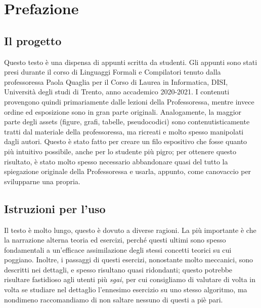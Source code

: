 \documentclass[class=book, crop=false, oneside, 12pt]{standalone}
\begin{document}
\chapter*{Prefazione}

\section*{Il progetto}
Questo testo è una dispensa di appunti scritta da studenti. Gli appunti sono stati presi durante il corso di Linguaggi Formali e Compilatori tenuto dalla professoressa Paola Quaglia per il Corso di Laurea in Informatica, DISI, Università degli studi di Trento, anno accademico 2020-2021. I contenuti provengono quindi primariamente dalle lezioni della Professoressa, mentre invece ordine ed esposizione sono in gran parte originali. Analogamente, la maggior parte degli assets (figure, grafi, tabelle, pseudocodici) sono contenutisticamente tratti dal materiale della professoressa, ma ricreati e molto spesso manipolati dagli autori. Questo è stato fatto per creare un filo espositivo che fosse quanto più intuitivo possibile, anche per lo studente più pigro; per ottenere questo risultato, è stato molto spesso necessario abbandonare quasi del tutto la spiegazione originale della Professoressa e usarla, appunto, come canovaccio per svilupparne una propria.

\section*{Istruzioni per l'uso}
Il testo è molto lungo, questo è dovuto a diverse ragioni. La più importante è che la narrazione alterna teoria ed esercizi, perché questi ultimi sono spesso fondamentali a un'efficace assimilazione degli stessi concetti teorici su cui poggiano. Inoltre, i passaggi di questi esercizi, nonostante molto meccanici, sono descritti nei dettagli, e spesso risultano quasi ridondanti; questo potrebbe risultare fastidioso agli utenti più \emph{sgai}, per cui consigliamo di valutare di volta in volta se studiare nel dettaglio l'ennesimo esercizio su uno stesso algoritmo, ma nondimeno raccomandiamo di non saltare nessuno di questi a piè pari.
\end{document}
